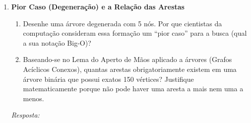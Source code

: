 \documentclass[12pt]{article}
\newcommand{\quadro}[1]{\vspace{0.2cm}\begin{tcolorbox}[colback=white, colframe=black, height=#1, boxrule=0.5pt, arc=0pt] \textit{Resposta:} \end{tcolorbox}}
\begin{document}
\begin{enumerate}[label=\textbf{\arabic*.}]
\begin{center}
\end{center}
\begin{enumerate}[label=\alph*)]
    \item Utilizando a fórmula apropriada, quantos nós \textit{no máximo} podem existir no nível $k=66$ (considerando que a raiz ocupa o nível 0)?
    \item Se uma árvore binária é perfeita e possui altura $h=312$, qual o seu número total de nós? Demonstre o cálculo.
\end{enumerate}
\quadro{7cm}

\item \textbf{Pior Caso (Degeneração) e a Relação das Arestas}
\begin{enumerate}[label=\alph*)]
    \item Desenhe uma árvore degenerada com 5 nós. Por que cientistas da computação consideram essa formação um ``pior caso'' para a busca (qual a sua notação Big-O)?
    \item Baseando-se no Lema do Aperto de Mãos aplicado a árvores (Grafos Acíclicos Conexos), quantas arestas obrigatoriamente existem em uma árvore binária que possui exatos 150 vértices? Justifique matematicamente porque não pode haver uma aresta a mais nem uma a menos.
\end{enumerate}
\quadro{10cm}

\end{enumerate}
\end{document}
